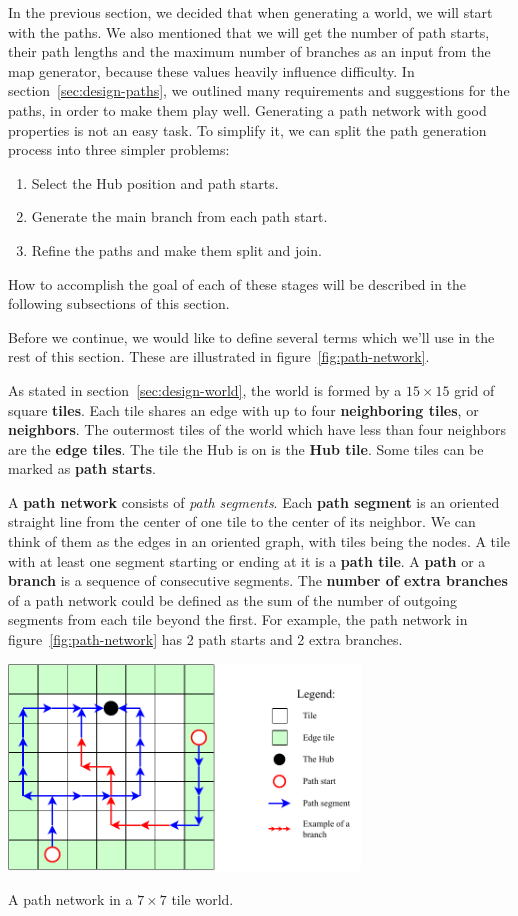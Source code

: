 In the previous section, we decided that when generating a world, we will start with the paths.
We also mentioned that we will get the number of path starts, their path lengths and the maximum number of branches as an input from the map generator, because these values heavily influence difficulty.
In section~\ref{sec:design-paths}, we outlined many requirements and suggestions for the paths, in order to make them play well.
Generating a path network with good properties is not an easy task.
To simplify it, we can split the path generation process into three simpler problems:
\begin{enumerate}
    \item Select the Hub position and path starts.
    \item Generate the main branch from each path start.
    \item Refine the paths and make them split and join.
\end{enumerate}
How to accomplish the goal of each of these stages will be described in the following subsections of this section.

Before we continue, we would like to define several terms which we'll use in the rest of this section.
These are illustrated in figure~\ref{fig:path-network}.

As stated in section~\ref{sec:design-world}, the world is formed by a $15\times15$ grid of square \textbf{tiles}.
Each tile shares an edge with up to four \textbf{neighboring tiles}, or \textbf{neighbors}.
The outermost tiles of the world which have less than four neighbors are the \textbf{edge tiles}.
The tile the Hub is on is the \textbf{Hub tile}.
Some tiles can be marked as \textbf{path starts}.

A \textbf{path network} consists of \emph{path segments}.
Each \textbf{path segment} is an oriented straight line from the center of one tile to the center of its neighbor.
We can think of them as the edges in an oriented graph, with tiles being the nodes.
A tile with at least one segment starting or ending at it is a \textbf{path tile}.
A \textbf{path} or a \textbf{branch} is a sequence of consecutive segments.
The \textbf{number of extra branches} of a path network could be defined as the sum of the number of outgoing segments from each tile beyond the first.
For example, the path network in figure~\ref{fig:path-network} has 2 path starts and 2 extra branches.

\begin{center}
    \captionsetup{type=figure}
    \includegraphics[width=0.7\textwidth]{img/Example path network.pdf}
    \caption{A path network in a $7\times7$ tile world.}
    \label{fig:path-network}
\end{center}

